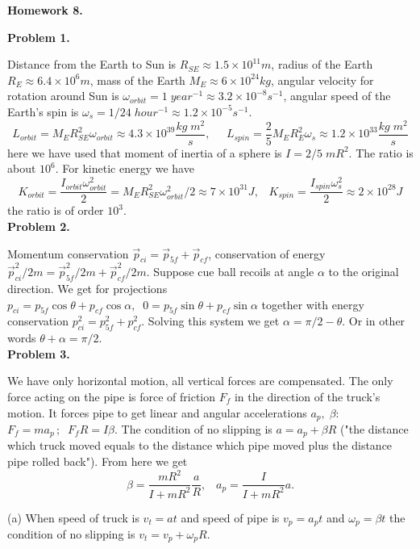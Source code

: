 \documentclass[12pt]{article}
\begin{document}
\begin{center}
{\bf\large Homework 8.}
\end{center}

{\bf Problem 1.}

Distance from the Earth to Sun is $R_{SE}\approx 1.5\times 10^{11} m$, radius of the Earth $R_E\approx 6.4\times 10^6 m$, mass of the Earth $M_E\approx 6\times 10^{24}kg$, angular velocity for rotation around
Sun is $\omega_{orbit}=1\;year^{-1}\approx 3.2\times10^{-8}s^{-1}$, angular speed of the Earth's spin is
$\omega_s=1/24\;hour^{-1}\approx 1.2\times 10^{-5} s^{-1}$.
$$L_{orbit}=M_E R_{SE}^2 \omega_{orbit}\approx 4.3\times 10^{39}\frac{kg\;m^2}{s},\;\;\;\;\;
L_{spin}=\frac{2}{5}M_E R_{E}^2 \omega_{s}\approx 1.2\times 10^{33}\frac{kg\;m^2}{s}$$
here we have used that moment of inertia of a sphere is $I=2/5 \; mR^2$. The ratio is about $10^6$.
For kinetic energy we have
$$K_{orbit}=\frac{I_{orbit}\omega_{orbit}^2 }{2}=M_E R_{SE}^2 \omega_{orbit}^2/2\approx 7\times10^{31}J,\;\;\;K_{spin}=\frac{I_{spin}\omega_{s}^2 }{2}\approx2\times 10^{28}J$$
the ratio is of order $10^3$.
\\

{\bf Problem 2.}

Momentum conservation $\vec{p}_{ci}=\vec{p}_{5f}+\vec{p}_{cf}$,  conservation of energy
$\vec{p}_{ci}^2/2m=\vec{p}_{5f}^2/2m+\vec{p}_{cf}^2/2m$. Suppose cue ball recoils at angle $\alpha$
to the original direction. We get for projections
$p_{ci}=p_{5f}\cos\theta +p_{cf}\cos\alpha,\;\;0=p_{5f}\sin\theta +p_{cf}\sin\alpha$ together with energy conservation $p_{ci}^2=p_{5f}^2 +p_{cf}^2$. Solving this system we get $\alpha =\pi/2 -\theta$.
Or in other words $\theta +\alpha=\pi/2$.
\\

{\bf Problem 3.}

We have only horizontal motion, all vertical forces are compensated. The only force acting on the pipe
is force of friction $F_f$ in the direction of the truck's motion. It forces pipe to get linear and angular accelerations
$a_p,\;\beta$:  $F_f=ma_p\,;\;\;F_f R=I\beta$. The condition of no slipping is $a=a_p+\beta R$ ("the distance which truck moved equals to the distance which pipe moved plus the distance pipe rolled back").
From here we get
$$\beta=\frac{mR^2}{I+mR^2}\frac{a}{R},\;\;\;a_p=\frac{I}{I+mR^2}a.$$

(a) When speed of truck is $v_t=at$ and speed of pipe is $v_p=a_p t$ and $\omega_p=\beta t$ the condition
of no slipping is $v_t=v_p+\omega_p R$.
\end{document}
